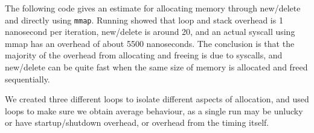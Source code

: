 \documentclass{article}
\newcommand{\includesource}[1]{%
}
\begin{document}
The following code gives an estimate for allocating memory through new/delete and directly using \texttt{mmap}. Running showed that loop and stack overhead is 1 nanosecond per iteration, new/delete is around 20, and an actual syscall using mmap has an overhead of about 5500 nanoseconds. The conclusion is that the majority of the overhead from allocating and freeing is due to syscalls, and new/delete can be quite fast when the same size of memory is allocated and freed sequentially.

We created three different loops to isolate different aspects of allocation, and used loops to make sure we obtain average behaviour, as a single run may be unlucky or have startup/shutdown overhead, or overhead from the timing itself.

\includesource{3/main.cc}
\end{document}
